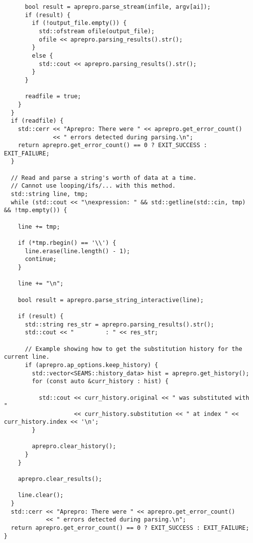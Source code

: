 \begin{lstlisting}
      bool result = aprepro.parse_stream(infile, argv[ai]);
      if (result) {
        if (!output_file.empty()) {
          std::ofstream ofile(output_file);
          ofile << aprepro.parsing_results().str();
        }
        else {
          std::cout << aprepro.parsing_results().str();
        }
      }

      readfile = true;
    }
  }
  if (readfile) {
    std::cerr << "Aprepro: There were " << aprepro.get_error_count()
              << " errors detected during parsing.\n";
    return aprepro.get_error_count() == 0 ? EXIT_SUCCESS : EXIT_FAILURE;
  }

  // Read and parse a string's worth of data at a time.
  // Cannot use looping/ifs/... with this method.
  std::string line, tmp;
  while (std::cout << "\nexpression: " && std::getline(std::cin, tmp) && !tmp.empty()) {

    line += tmp;

    if (*tmp.rbegin() == '\\') {
      line.erase(line.length() - 1);
      continue;
    }

    line += "\n";

    bool result = aprepro.parse_string_interactive(line);

    if (result) {
      std::string res_str = aprepro.parsing_results().str();
      std::cout << "         : " << res_str;

      // Example showing how to get the substitution history for the current line.
      if (aprepro.ap_options.keep_history) {
        std::vector<SEAMS::history_data> hist = aprepro.get_history();
        for (const auto &curr_history : hist) {

          std::cout << curr_history.original << " was substituted with "
                    << curr_history.substitution << " at index " << curr_history.index << '\n';
        }

        aprepro.clear_history();
      }
    }

    aprepro.clear_results();

    line.clear();
  }
  std::cerr << "Aprepro: There were " << aprepro.get_error_count()
            << " errors detected during parsing.\n";
  return aprepro.get_error_count() == 0 ? EXIT_SUCCESS : EXIT_FAILURE;
}
\end{lstlisting}
